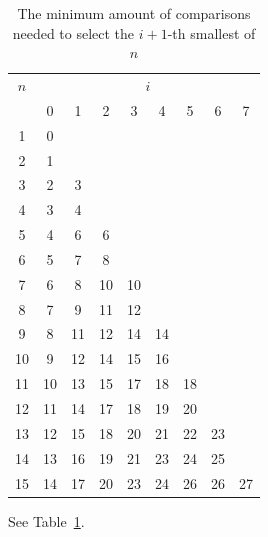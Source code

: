 \documentclass[10pt,journal,compsoc]{IEEEtran}
\begin{document}
\begin{table}[!t]
  \renewcommand{\arraystretch}{1.2}
  \caption{The minimum amount of comparisons needed to select the $i+1$-th smallest of $n$}
  \label{table:num-comparisons}
  \centering
  \begin{tabular}{c|cccccccc}
    $n$ & \multicolumn{8}{c}{$i$}                                    \\
        & 0                       & 1  & 2  & 3  & 4  & 5  & 6  & 7  \\ \hline
    1   & 0                                                          \\
    2   & 1                                                          \\
    3   & 2                       & 3                                \\
    4   & 3                       & 4                                \\
    5   & 4                       & 6  & 6                           \\
    6   & 5                       & 7  & 8                           \\
    7   & 6                       & 8  & 10 & 10                     \\
    8   & 7                       & 9  & 11 & 12                     \\
    9   & 8                       & 11 & 12 & 14 & 14                \\
    10  & 9                       & 12 & 14 & 15 & 16                \\
    11  & 10                      & 13 & 15 & 17 & 18 & 18           \\
    12  & 11                      & 14 & 17 & 18 & 19 & 20           \\
    13  & 12                      & 15 & 18 & 20 & 21 & 22 & 23      \\
    14  & 13                      & 16 & 19 & 21 & 23 & 24 & 25      \\
    15  & 14                      & 17 & 20 & 23 & 24 & 26 & 26 & 27 \\
  \end{tabular}
\end{table}

See Table~\ref{table:num-comparisons}.
\end{document}
